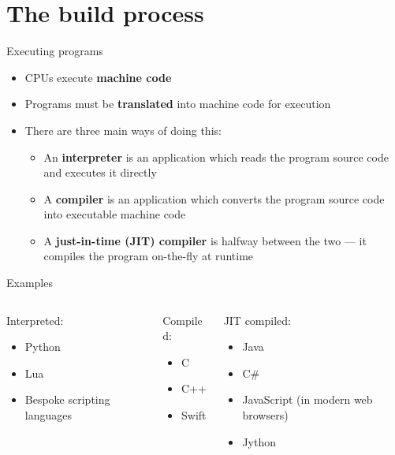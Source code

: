 \part{The build process}
\frame{\partpage}

\begin{frame}{Executing programs}
    \begin{itemize}
        \item CPUs execute \textbf{machine code} \pause
        \item Programs must be \textbf{translated} into machine code for execution \pause
        \item There are three main ways of doing this: \pause
        \begin{itemize}
            \item An \textbf{interpreter} is an application which reads the program source code and executes it directly \pause
            \item A \textbf{compiler} is an application which converts the program source code into executable machine code \pause
            \item A \textbf{just-in-time (JIT) compiler} is halfway between the two --- it compiles the program on-the-fly
                at runtime
        \end{itemize}
    \end{itemize}
\end{frame}

\begin{frame}{Examples}
	\begin{columns}[t,onlytextwidth]
		\begin{column}{0.3\textwidth}
		    Interpreted:
		    \begin{itemize}
		        \item Python
		        \item Lua
		        \item Bespoke scripting languages
		    \end{itemize}
		\end{column} \pause
		\begin{column}{0.3\textwidth}
		    Compiled:
		    \begin{itemize}
		        \item C
		        \item C++
		        \item Swift
		    \end{itemize}
		\end{column} \pause
		\begin{column}{0.3\textwidth}
		    JIT compiled:
		    \begin{itemize}
		        \item Java
		        \item C\#
		        \item JavaScript (in modern web browsers)
		        \item Jython
		    \end{itemize}
		\end{column}
	\end{columns}
\end{frame}

